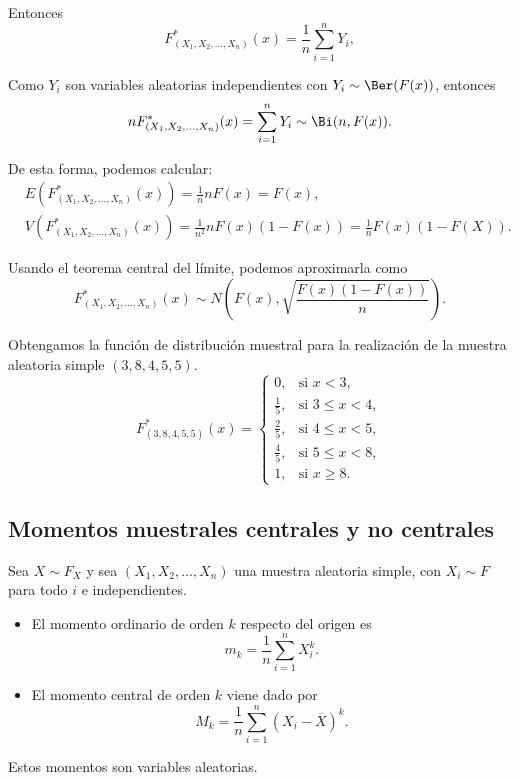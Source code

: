 Entonces
$$F_{(X_1, X_2, \dots, X_n)}^\ast(x) = \frac{1}{n}\sum_{i=1}^{n}{Y_i},$$

Como $Y_i$ son variables aleatorias independientes con $Y_i \sim \Ber(F(x))$, entonces
$$nF_{(X_1, X_2, \dots, X_n)}^\ast(x) = \sum_{i=1}^{n}{Y_i} \sim \Bi(n, F(x)).$$

De esta forma, podemos calcular:
\begin{align*}
     & E(F_{(X_1, X_2, \dots, X_n)}^\ast(x)) = \frac{1}{n}nF(x) = F(x), \\
     & V(F_{(X_1, X_2, \dots, X_n)}^\ast(x)) = \frac{1}{n^2}nF(x)(1 - F(x)) = \frac{1}{n}F(x)(1 - F(X)).
\end{align*}

Usando el teorema central del límite, podemos aproximarla como
$$F_{(X_1, X_2, \dots, X_n)}^\ast(x) \sim N\left( F(x), \sqrt{\frac{F(x)(1 - F(x))}{n}}\right).$$

\begin{example}
    Obtengamos la función de distribución muestral para la realización de la muestra aleatoria simple $(3, 8, 4, 5, 5)$.
    $$F_{(3, 8, 4, 5, 5)}^\ast(x) = \begin{cases}
        0, & \text{si } x < 3, \\
        \frac{1}{5}, & \text{si } 3 \leq x < 4, \\ 
        \frac{2}{5}, & \text{si } 4 \leq x < 5, \\
        \frac{4}{5}, & \text{si } 5 \leq x < 8, \\
        1, & \text{si } x \geq 8.
    \end{cases}$$
\end{example}

\subsection{Momentos muestrales centrales y no centrales}
Sea $X \sim F_X$ y sea $(X_1, X_2, \dots, X_n)$ una muestra aleatoria simple, con $X_i \sim F$ para todo $i$ e independientes.

\begin{itemize}
    \item El momento ordinario de orden $k$ respecto del origen es
    $$m_k = \frac{1}{n} \sum_{i=1}^{n}{X_i^k}.$$
    
    \item El momento central de orden $k$ viene dado por
    $$M_k = \frac{1}{n} \sum_{i=1}^{n} (X_i - \overline{X})^k.$$
\end{itemize}

\begin{note}
    Estos momentos son variables aleatorias.
\end{note}